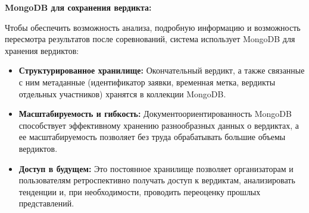 \textbf{MongoDB для сохранения вердикта:}

Чтобы обеспечить возможность анализа, подробную информацию и возможность пересмотра результатов после соревнований, система использует MongoDB для хранения вердиктов:
\begin{itemize}
    \itemsep 0em
    \item \textbf{Структурированное хранилище:} Окончательный вердикт, а также связанные с ним метаданные (идентификатор заявки, временная метка, вердикты отдельных участников) хранятся в коллекции MongoDB.
    \item \textbf{Масштабируемость и гибкость:} Документоориентированность MongoDB способствует эффективному хранению разнообразных данных о вердиктах, а ее масштабируемость позволяет без труда обрабатывать большие объемы вердиктов.
    \item \textbf{Доступ в будущем:} Это постоянное хранилище позволяет организаторам и пользователям ретроспективно получать доступ к вердиктам, анализировать тенденции и, при необходимости, проводить переоценку прошлых представлений.
\end{itemize}





